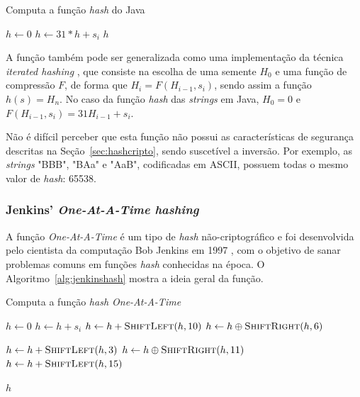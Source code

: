 \begin{algorithm}
\linespread{1}\selectfont
\caption{Computa a função \emph{hash} do Java}
\label{alg:javahash}
\begin{algorithmic}[1]

    \State $h \gets 0$
        \State $h \gets 31 * h + s_i$
	\EndFor
    \Return $h$
\EndFunction
\end{algorithmic}
\end{algorithm}


A função também pode ser generalizada como uma implementação da técnica \emph{iterated hashing} \cite{lemire2012universality}, que consiste na escolha de uma semente $H_0$ e uma função de compressão $F$, de forma que $H_i = F(H_{i-1}, s_i)$, sendo assim a função $h(s) = H_n$. No caso da função \emph{hash} das \emph{strings} em Java, $H_0 = 0$ e $F(H_{i-1}, s_i) = 31 H_{i-1} + s_i$.

Não é difícil perceber que esta função não possui as características de segurança descritas na Seção~\ref{sec:hashcripto}, sendo suscetível a inversão. Por exemplo, as \emph{strings} "BBB", "BAa" e "AaB", codificadas em ASCII, possuem todas o mesmo valor de \emph{hash}: 65538.

\subsubsection{Jenkins' \emph{One-At-A-Time hashing}}

A função \emph{One-At-A-Time} é um tipo de \emph{hash} não-criptográfico e foi desenvolvida pelo cientista da computação Bob Jenkins em 1997 \cite{jenkins1997hash}, com o objetivo de sanar problemas comuns em funções \emph{hash} conhecidas na época. O Algoritmo~\ref{alg:jenkinshash} mostra a ideia geral da função.

\begin{algorithm}
\linespread{1}\selectfont
\caption{Computa a função \emph{hash One-At-A-Time}}
\label{alg:jenkinshash}
\begin{algorithmic}[1]

    \State $h \gets 0$
        \State $h \gets h + s_i$
        \State $h \gets h + \Call{ShiftLeft}{h, 10}$
        \State $h \gets h \oplus \Call{ShiftRight}{h,6}$
	\EndFor

    \State $h \gets h + \Call{ShiftLeft}{h, 3}$
    \State $h \gets h \oplus \Call{ShiftRight}{h,11}$
    \State $h \gets h + \Call{ShiftLeft}{h, 15}$

    \Return $h$
\EndFunction
\end{algorithmic}
\end{algorithm}

